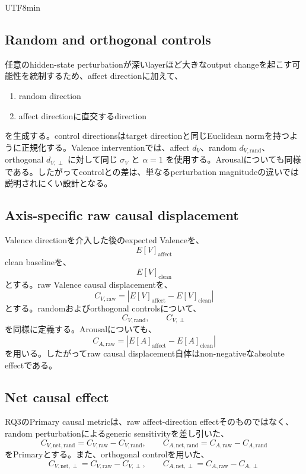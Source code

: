 \documentclass{article} %
\begin{document}
\begin{CJK*}{UTF8}{min}
\subsection{Random and orthogonal controls}

任意のhidden-state perturbationが深いlayerほど大きなoutput changeを起こす可能性を統制するため、affect directionに加えて、
\begin{enumerate}
    \item random direction
    \item affect directionに直交するdirection
\end{enumerate}
を生成する。control directionsはtarget directionと同じEuclidean normを持つように正規化する。Valence interventionでは、affect \(d_V\)、random \(d_{V,\mathrm{rand}}\)、orthogonal \(d_{V,\perp}\) に対して同じ \(\sigma_V\) と \(\alpha=1\) を使用する。Arousalについても同様である。したがってcontrolとの差は、単なるperturbation magnitudeの違いでは説明されにくい設計となる。


\subsection{Axis-specific raw causal displacement}

Valence directionを介入した後のexpected Valenceを、
\[
E[V]_{\mathrm{affect}}
\]
clean baselineを、
\[
E[V]_{\mathrm{clean}}
\]
とする。raw Valence causal displacementを、
\[
C_{V,\mathrm{raw}}
=
\left|
E[V]_{\mathrm{affect}}
-
E[V]_{\mathrm{clean}}
\right|
\]
とする。randomおよびorthogonal controlsについて、
\[
C_{V,\mathrm{rand}},
\qquad
C_{V,\perp}
\]
を同様に定義する。Arousalについても、
\[
C_{A,\mathrm{raw}}
=
\left|
E[A]_{\mathrm{affect}}
-
E[A]_{\mathrm{clean}}
\right|
\]
を用いる。したがってraw causal displacement自体はnon-negativeなabsolute effectである。


\subsection{Net causal effect}

RQ3のPrimary causal metricは、raw affect-direction effectそのものではなく、random perturbationによるgeneric sensitivityを差し引いた、
\[
C_{V,\mathrm{net,rand}} = C_{V,\mathrm{raw}} - C_{V,\mathrm{rand}},
\qquad
C_{A,\mathrm{net,rand}} = C_{A,\mathrm{raw}} - C_{A,\mathrm{rand}}
\]
をPrimaryとする。また、orthogonal controlを用いた、
\[
C_{V,\mathrm{net,\perp}} = C_{V,\mathrm{raw}} - C_{V,\perp},
\qquad
C_{A,\mathrm{net,\perp}} = C_{A,\mathrm{raw}} - C_{A,\perp}
\]


\end{CJK*}
\end{document}
